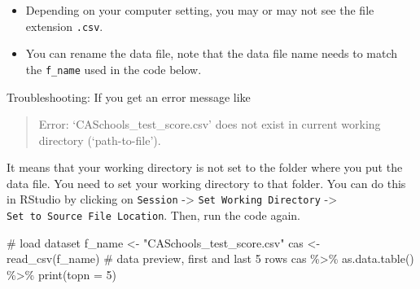 \documentclass[
  12pt,
  letterpaper,
]{scrbook}
\newenvironment{Shaded}{\begin{snugshade}}{\end{snugshade}}
\newcommand{\AttributeTok}[1]{\textcolor[rgb]{0.40,0.45,0.13}{#1}}
\newcommand{\CommentTok}[1]{\textcolor[rgb]{0.37,0.37,0.37}{#1}}
\newcommand{\DecValTok}[1]{\textcolor[rgb]{0.68,0.00,0.00}{#1}}
\newcommand{\FunctionTok}[1]{\textcolor[rgb]{0.28,0.35,0.67}{#1}}
\newcommand{\NormalTok}[1]{\textcolor[rgb]{0.00,0.23,0.31}{#1}}
\newcommand{\OtherTok}[1]{\textcolor[rgb]{0.00,0.23,0.31}{#1}}
\newcommand{\SpecialCharTok}[1]{\textcolor[rgb]{0.37,0.37,0.37}{#1}}
\newcommand{\StringTok}[1]{\textcolor[rgb]{0.13,0.47,0.30}{#1}}
\providecommand{\tightlist}{%
  \setlength{\itemsep}{0pt}\setlength{\parskip}{0pt}}
\renewcommand{\tightlist}{\setlength{\itemsep}{0.5\baselineskip}\setlength{\parskip}{0.2\baselineskip}}
\theoremstyle{definition}
\theoremstyle{plain}
\theoremstyle{remark}
\begin{document}
\begin{itemize}
\tightlist
\item
  Depending on your computer setting, you may or may not see the file
  extension \texttt{.csv}.
\item
  You can rename the data file, note that the data file name needs to
  match the \texttt{f\_name} used in the code below.
\end{itemize}

Troubleshooting: If you get an error message like

\begin{quote}
Error: `CASchools\_test\_score.csv' does not exist in current working
directory (`path-to-file').
\end{quote}

It means that your working directory is not set to the folder where you
put the data file. You need to set your working directory to that
folder. You can do this in RStudio by clicking on \texttt{Session}
-\textgreater{} \texttt{Set\ Working\ Directory} -\textgreater{}
\texttt{Set\ to\ Source\ File\ Location}. Then, run the code again.

\begin{Shaded}
\begin{Highlighting}[]
\CommentTok{\# load dataset}
\NormalTok{f\_name }\OtherTok{\textless{}{-}} \StringTok{"CASchools\_test\_score.csv"}
\NormalTok{cas }\OtherTok{\textless{}{-}} \FunctionTok{read\_csv}\NormalTok{(f\_name)}
\CommentTok{\# data preview, first and last 5 rows}
\NormalTok{cas }\SpecialCharTok{\%\textgreater{}\%} \FunctionTok{as.data.table}\NormalTok{() }\SpecialCharTok{\%\textgreater{}\%} \FunctionTok{print}\NormalTok{(}\AttributeTok{topn =} \DecValTok{5}\NormalTok{)}
\end{Highlighting}
\end{Shaded}
\end{document}
